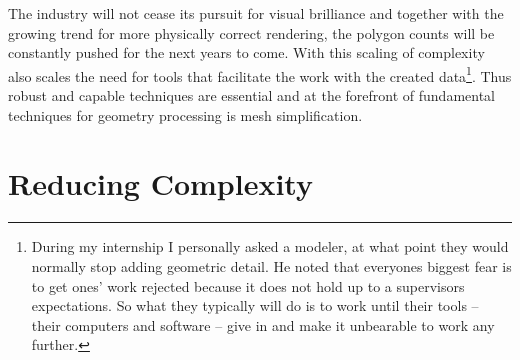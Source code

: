 The industry will not cease its pursuit for visual brilliance and together with the growing trend for more physically correct rendering, the polygon counts will be constantly pushed for the next years to come.
With this scaling of complexity also scales the need for tools that facilitate the work with the created data\footnote{ During my internship I personally asked a modeler, at what point they would normally stop adding geometric detail. He noted that everyones biggest fear is to get ones' work rejected because it does not hold up to a supervisors expectations. So what they typically will do is to work until their tools -- their computers and software -- give in and make it unbearable to work any further.}.
Thus robust and capable techniques are essential and at the forefront of fundamental techniques for geometry processing is mesh simplification.

\section{Reducing Complexity}
\label{introduction3}

